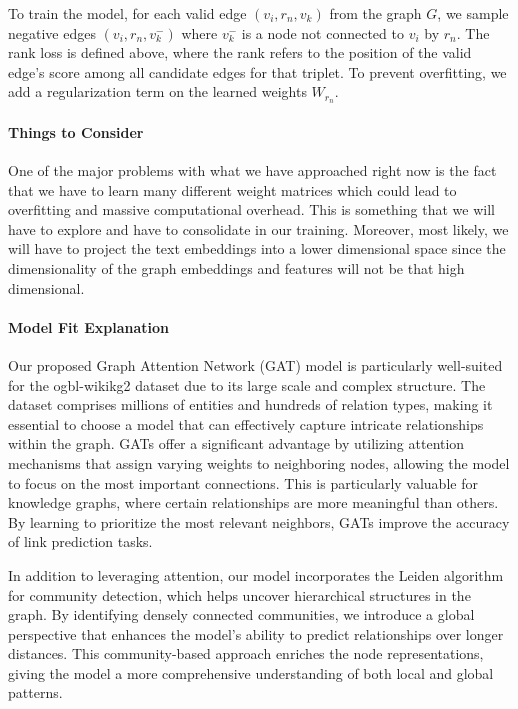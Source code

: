 \documentclass{article}
\begin{document}
To train the model, for each valid edge \((v_i, r_n, v_k)\) from the graph \(G\), we sample negative edges \((v_i, r_n, v_k^-)\) where \(v_k^-\) is a node not connected to \(v_i\) by \(r_n\). The rank loss is defined above, where the rank refers to the position of the valid edge's score among all candidate edges for that triplet. To prevent overfitting, we add a regularization term on the learned weights \(W_{r_n}\).

\paragraph{Things to Consider} One of the major problems with what we have approached right now is the fact that we have to learn many different weight matrices which could lead to overfitting and massive computational overhead. This is something that we will have to explore and have to consolidate in our training. Moreover, most likely, we will have to project the text embeddings into a lower dimensional space since the dimensionality of the graph embeddings and features will not be that high dimensional. 

\paragraph{Model Fit Explanation} 

Our proposed Graph Attention Network (GAT) model is particularly well-suited for the ogbl-wikikg2 \cite{ogblwikikg2dataset} dataset due to its large scale and complex structure. The dataset comprises millions of entities and hundreds of relation types, making it essential to choose a model that can effectively capture intricate relationships within the graph. GATs offer a significant advantage by utilizing attention mechanisms that assign varying weights to neighboring nodes, allowing the model to focus on the most important connections. This is particularly valuable for knowledge graphs, where certain relationships are more meaningful than others. By learning to prioritize the most relevant neighbors, GATs improve the accuracy of link prediction tasks.

In addition to leveraging attention, our model incorporates the Leiden algorithm for community detection, which helps uncover hierarchical structures in the graph. By identifying densely connected communities, we introduce a global perspective that enhances the model’s ability to predict relationships over longer distances. This community-based approach enriches the node representations, giving the model a more comprehensive understanding of both local and global patterns.
\end{document}
